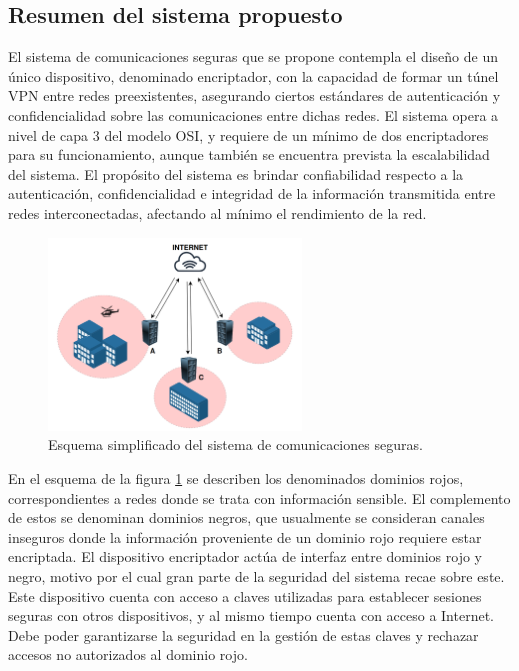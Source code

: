 \documentclass[12pt]{article}
\begin{document}
\subsection{Resumen del sistema propuesto}
El sistema de comunicaciones seguras que se propone contempla el diseño de un único dispositivo, denominado encriptador, con la capacidad de formar un túnel VPN entre redes preexistentes, asegurando ciertos estándares de autenticación y confidencialidad sobre las comunicaciones entre dichas redes. El sistema opera a nivel de capa 3 del modelo OSI, y requiere de un mínimo de dos encriptadores para su funcionamiento, aunque también se encuentra prevista la escalabilidad del sistema.
El propósito del sistema es brindar confiabilidad respecto a la autenticación, confidencialidad e integridad de la información transmitida entre redes interconectadas,  afectando al mínimo el rendimiento de la red.

\begin{figure}[h!]
    \centering    
    \includegraphics[width=0.6\textwidth]{images/overview.png}
    \caption{Esquema simplificado del sistema de comunicaciones seguras.}
    \label{fig:overview}
\end{figure}

En el esquema de la figura \ref{fig:overview} se describen los denominados dominios rojos, correspondientes a redes donde se trata con información sensible. El complemento de estos se denominan dominios negros, que usualmente se consideran canales inseguros donde la información proveniente de un dominio rojo requiere estar encriptada. 
El dispositivo encriptador actúa de interfaz entre dominios rojo y negro, motivo por el cual gran parte de la seguridad del sistema recae sobre este. Este dispositivo cuenta con acceso a claves utilizadas para establecer sesiones seguras con otros dispositivos, y al mismo tiempo cuenta con acceso a Internet. Debe poder garantizarse la seguridad en la gestión de estas claves y rechazar accesos no autorizados al dominio rojo.
\end{document}
